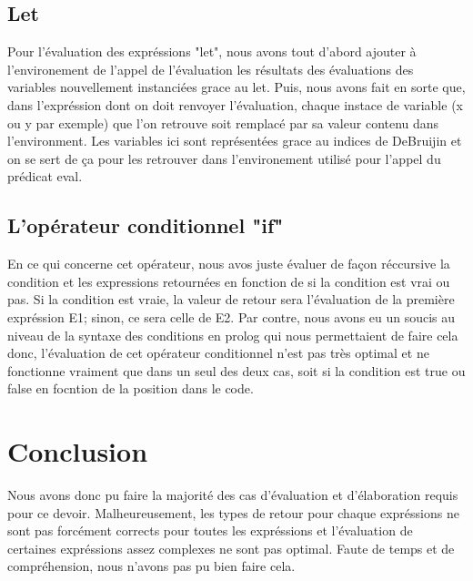 \documentclass{article}
\begin{document}
 \subsection{Let}
 Pour l'évaluation des expréssions "let", nous avons tout d'abord ajouter à l'environement de l'appel de l'évaluation les résultats des évaluations des variables nouvellement instanciées grace au let. Puis, nous avons fait en sorte que, dans l'expréssion dont on doit renvoyer l'évaluation, chaque instace de variable (x ou y par exemple) que l'on retrouve soit remplacé par sa valeur contenu dans l'environment. Les variables ici sont représentées grace au indices de DeBruijin et on se sert de ça pour les retrouver dans l'environement utilisé pour l'appel du prédicat eval. 
 
 \subsection{L'opérateur conditionnel "if"}
 En ce qui concerne cet opérateur, nous avos juste évaluer de façon réccursive la condition et les expressions retournées en fonction de si la condition est vrai ou pas. Si la condition est vraie, la valeur de retour sera l'évaluation de la première expréssion E1; sinon, ce sera celle de E2. Par contre, nous avons eu un soucis au niveau de la syntaxe des conditions en prolog qui nous permettaient de faire cela donc, l'évaluation de cet opérateur conditionnel n'est pas très optimal et ne fonctionne vraiment que dans un seul des deux cas, soit si la condition est true ou false en focntion de la position dans le code.
 
 \section{Conclusion}
 Nous avons donc pu faire la majorité des cas d'évaluation et d'élaboration requis pour ce devoir. Malheureusement, les types de retour pour chaque expréssions ne sont pas forcément corrects pour toutes les expréssions et l'évaluation de certaines expréssions assez complexes ne sont pas optimal. Faute de temps et de compréhension, nous n'avons pas pu bien faire cela.
\end{document}
